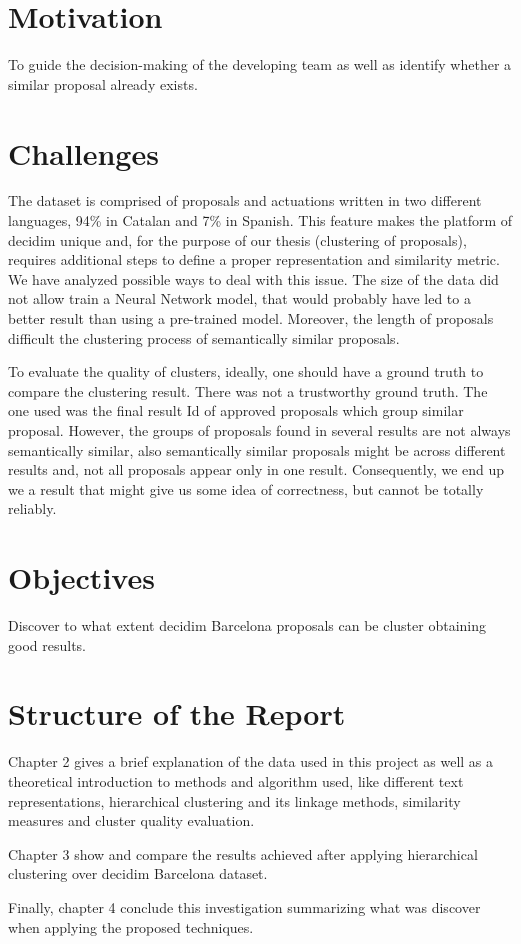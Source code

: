 \section{Motivation}
To guide the decision-making of the developing team as well as identify whether a similar proposal already exists.
\section{Challenges}
The dataset is comprised of proposals and actuations written in two different languages, 94\% in Catalan and 7\% in Spanish. This feature makes the platform of decidim unique and, for the purpose of our thesis (clustering of proposals), requires additional steps to define a proper representation and similarity metric. We have analyzed possible ways to deal with this issue.
The size of the data did not allow train a Neural Network model, that would probably have led to a better result than using a pre-trained model. Moreover, the length of proposals difficult the clustering process of semantically similar proposals.

To evaluate the quality of clusters, ideally, one should have a ground truth to compare the clustering result. There was not a trustworthy ground truth. The one used was the final result Id of approved proposals which group similar proposal. However, the groups of proposals found in several results are not always semantically similar, also semantically similar proposals might be across different results and, not all proposals appear only in one result. Consequently, we end up we a result that might give us some idea of correctness, but cannot be totally reliably.


\section{Objectives}
Discover to what extent decidim Barcelona proposals can be cluster obtaining good results.

\section{Structure of the Report}

Chapter 2 gives a brief explanation of the data used in this project as well as a theoretical introduction to methods and algorithm used, like different text representations, hierarchical clustering and its linkage methods, similarity measures and cluster quality evaluation.

Chapter 3 show and compare the results achieved after applying hierarchical clustering over decidim Barcelona dataset.

Finally, chapter 4 conclude this investigation summarizing what was discover when applying the proposed techniques. 


\newpage


